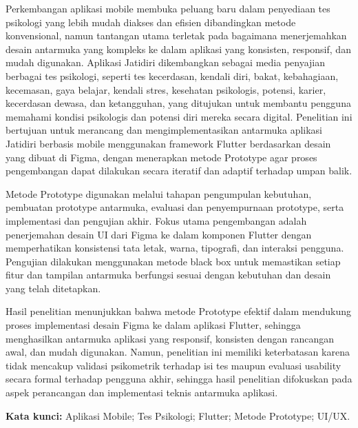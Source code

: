 \begin{abstrak}
Perkembangan aplikasi mobile membuka peluang baru dalam penyediaan tes psikologi yang lebih mudah diakses dan efisien dibandingkan metode konvensional, namun tantangan utama terletak pada bagaimana menerjemahkan desain antarmuka yang kompleks ke dalam aplikasi yang konsisten, responsif, dan mudah digunakan. Aplikasi Jatidiri dikembangkan sebagai media penyajian berbagai tes psikologi, seperti tes kecerdasan, kendali diri, bakat, kebahagiaan, kecemasan, gaya belajar, kendali stres, kesehatan psikologis, potensi, karier, kecerdasan dewasa, dan ketangguhan, yang ditujukan untuk membantu pengguna memahami kondisi psikologis dan potensi diri mereka secara digital. Penelitian ini bertujuan untuk merancang dan mengimplementasikan antarmuka aplikasi Jatidiri berbasis mobile menggunakan framework Flutter berdasarkan desain yang dibuat di Figma, dengan menerapkan metode Prototype agar proses pengembangan dapat dilakukan secara iteratif dan adaptif terhadap umpan balik.

Metode Prototype digunakan melalui tahapan pengumpulan kebutuhan, pembuatan prototype antarmuka, evaluasi dan penyempurnaan prototype, serta implementasi dan pengujian akhir. Fokus utama pengembangan adalah penerjemahan desain UI dari Figma ke dalam komponen Flutter dengan memperhatikan konsistensi tata letak, warna, tipografi, dan interaksi pengguna. Pengujian dilakukan menggunakan metode black box untuk memastikan setiap fitur dan tampilan antarmuka berfungsi sesuai dengan kebutuhan dan desain yang telah ditetapkan.

Hasil penelitian menunjukkan bahwa metode Prototype efektif dalam mendukung proses implementasi desain Figma ke dalam aplikasi Flutter, sehingga menghasilkan antarmuka aplikasi yang responsif, konsisten dengan rancangan awal, dan mudah digunakan. Namun, penelitian ini memiliki keterbatasan karena tidak mencakup validasi psikometrik terhadap isi tes maupun evaluasi usability secara formal terhadap pengguna akhir, sehingga hasil penelitian difokuskan pada aspek perancangan dan implementasi teknis antarmuka aplikasi.
\end{abstrak}

\noindent \textbf{Kata kunci:} Aplikasi Mobile; Tes Psikologi; Flutter; Metode Prototype; UI/UX.
